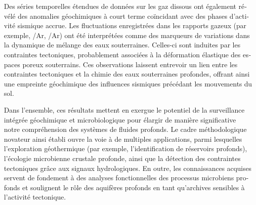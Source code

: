 \begin{otherlanguage}{french}
Des séries temporelles étendues de données sur les gaz dissous ont également révélé des anomalies géochimiques à court terme coïncidant avec des phases d'activité sismique accrue.
Les fluctuations enregistrées dans les rapports gazeux (par exemple, /Ar, /Ar) ont été interprétées comme des marqueurs de variations dans la dynamique de mélange des eaux souterraines.
Celles-ci sont induites par les contraintes tectoniques, probablement associées à la déformation élastique des espaces poreux souterrains.
Ces observations laissent entrevoir un lien entre les contraintes tectoniques et la chimie des eaux souterraines profondes, offrant ainsi une empreinte géochimique des influences sismiques précédant les mouvements du sol.

Dans l'ensemble, ces résultats mettent en exergue le potentiel de la surveillance intégrée géochimique et microbiologique pour élargir de manière significative notre compréhension des systèmes de fluides profonds.
Le cadre méthodologique novateur ainsi établi ouvre la voie à de multiples applications, parmi lesquelles l'exploration géothermique (par exemple, l'identification de réservoirs profonds), l'écologie microbienne crustale profonde, ainsi que la détection des contraintes tectoniques grâce aux signaux hydrologiques.
En outre, les connaissances acquises servent de fondement à des analyses fonctionnelles des processus microbiens profonds et soulignent le rôle des aquifères profonds en tant qu'archives sensibles à l'activité tectonique.


\end{otherlanguage}

\endgroup

\vfill


\cleardoublepage%


\begingroup
\let\clearpage\relax
\let\cleardoublepage\relax
\let\cleardoublepage\relax

